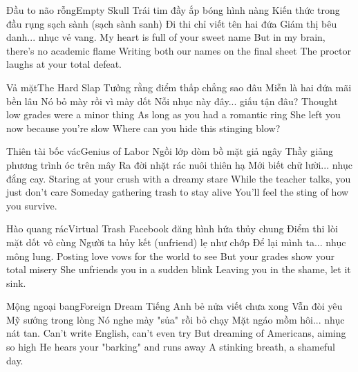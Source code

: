 \begin{tutuyetbox}{Đầu to não rỗng}{Empty Skull}
Trái tim đầy ắp bóng hình nàng
Kiến thức trong đầu rụng sạch sành (sạch sành sanh)
Đi thi chỉ viết tên hai đứa
Giám thị bêu danh... nhục vẻ vang.
\tcblower
My heart is full of your sweet name
But in my brain, there's no academic flame
Writing both our names on the final sheet
The proctor laughs at your total defeat.
\end{tutuyetbox}

\begin{tutuyetbox}{Vả mặt}{The Hard Slap}
Tưởng rằng điểm thấp chẳng sao đâu
Miễn là hai đứa mãi bền lâu
Nó bỏ mày rồi vì mày dốt
Nỗi nhục này đây... giấu tận đâu?
\tcblower
Thought low grades were a minor thing
As long as you had a romantic ring
She left you now because you're slow
Where can you hide this stinging blow?
\end{tutuyetbox}

\begin{tutuyetbox}{Thiên tài bốc vác}{Genius of Labor}
Ngồi lớp dòm bồ mặt giả ngây
Thầy giảng phương trình óc trên mây
Ra đời nhặt rác nuôi thiên hạ
Mới biết chữ lười... nhục đắng cay.
\tcblower
Staring at your crush with a dreamy stare
While the teacher talks, you just don't care
Someday gathering trash to stay alive
You'll feel the sting of how you survive.
\end{tutuyetbox}

\begin{tutuyetbox}{Hào quang rác}{Virtual Trash}
Facebook đăng hình hứa thủy chung
Điểm thi lòi mặt dốt vô cùng
Người ta hủy kết (unfriend) lẹ như chớp
Để lại mình ta... nhục mông lung.
\tcblower
Posting love vows for the world to see
But your grades show your total misery
She unfriends you in a sudden blink
Leaving you in the shame, let it sink.
\end{tutuyetbox}

\begin{tutuyetbox}{Mộng ngoại bang}{Foreign Dream}
Tiếng Anh bẻ nửa viết chưa xong
Vẫn đòi yêu Mỹ sướng trong lòng
Nó nghe mày "sủa" rồi bỏ chạy
Mặt ngáo mồm hôi... nhục nát tan.
\tcblower
Can't write English, can't even try
But dreaming of Americans, aiming so high
He hears your "barking" and runs away
A stinking breath, a shameful day.
\end{tutuyetbox}

